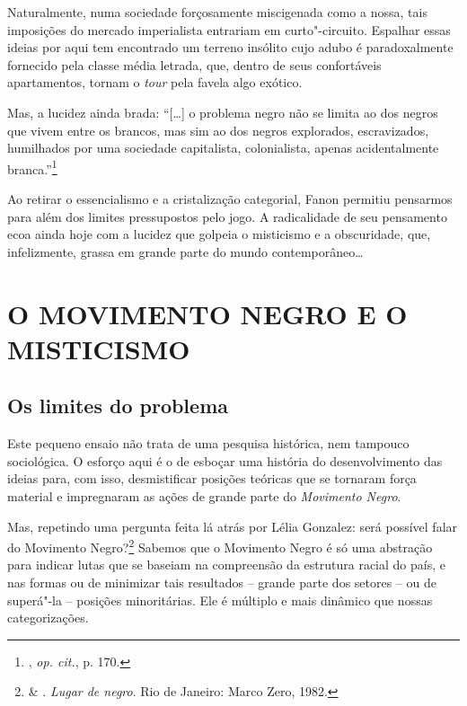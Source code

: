 Naturalmente, numa sociedade forçosamente miscigenada como a nossa, tais
imposições do mercado imperialista entrariam em curto"-circuito.
Espalhar essas ideias por aqui
tem encontrado um terreno insólito cujo adubo é paradoxalmente fornecido
pela classe média letrada, que, dentro de seus confortáveis
apartamentos, tornam o \emph{tour} pela favela algo exótico.

Mas, a lucidez ainda brada:
``{[}\ldots{}{]} o problema negro não
se limita ao dos negros que vivem entre os brancos, mas sim ao dos
negros explorados, escravizados, humilhados por uma sociedade
capitalista, colonialista, apenas acidentalmente branca.''\footnote{,
  \emph{op. cit.}, p. 170.}

Ao retirar o essencialismo e a cristalização categorial, Fanon permitiu
pensarmos para além dos limites pressupostos pelo jogo. A radicalidade
de seu pensamento ecoa ainda hoje com a lucidez que golpeia o misticismo
e a obscuridade, que, infelizmente, grassa em grande parte do mundo
contemporâneo\ldots{}

\part{O MOVIMENTO NEGRO E O MISTICISMO}
\removeepigraph

\chapter{Os limites do problema}

Este pequeno ensaio não trata de uma pesquisa histórica, nem tampouco
sociológica. O esforço aqui é o de esboçar uma história do
desenvolvimento das ideias para, com isso,
desmistificar posições teóricas
que se tornaram força material e impregnaram as ações de grande parte do
\emph{Movimento Negro}.

Mas, repetindo uma pergunta feita lá atrás por Lélia Gonzalez: será
possível falar do Movimento Negro?\footnote{ \& .
  \emph{Lugar de negro}. Rio de Janeiro: Marco Zero, 1982.}
Sabemos que o Movimento Negro é
só uma abstração para indicar lutas que se baseiam na compreensão da
estrutura racial do país, e nas formas ou de minimizar tais resultados
-- grande parte dos setores -- ou de superá"-la -- posições minoritárias.
Ele é múltiplo e mais dinâmico que nossas categorizações.

